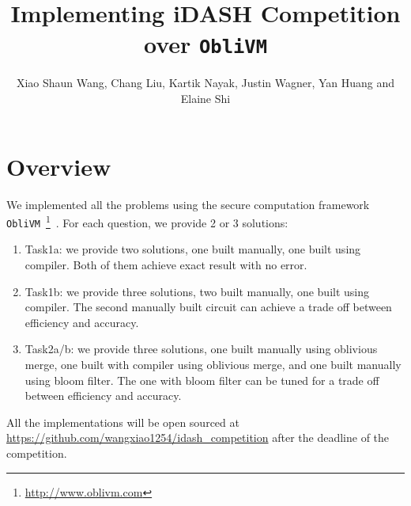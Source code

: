 \documentclass{article}
\title{Implementing iDASH Competition over {\tt ObliVM}}
\author{Xiao Shaun Wang, Chang Liu, Kartik Nayak, Justin Wagner, Yan Huang and Elaine Shi}
\begin{document}
\maketitle
\section{Overview}
We implemented all the problems using the secure computation framework {\tt ObliVM}~\footnote{\url{http://www.oblivm.com}}~\cite{oblivm}.
For each question, we provide 2 or 3 solutions:
\begin{enumerate}
\item Task1a: we provide two solutions, one built manually, one built using compiler. Both of them achieve exact result with no error.
\item Task1b: we provide three solutions, two built manually, one built using compiler. The second manually built circuit can achieve a trade off between efficiency and accuracy.
\item Task2a/b: we provide three solutions, one built manually using oblivious merge, one built with compiler using oblivious merge, and one built manually using bloom filter. The one with bloom filter can be tuned for a trade off between efficiency and accuracy.
\end{enumerate}

All the implementations will be open sourced at \url{https://github.com/wangxiao1254/idash_competition} after the deadline of the competition.


%


\end{document}
